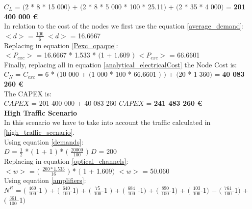 $C_L$ = $($2 * 8 * 15 000$)$ + $($2 * 8 * 5 000 * 100 * 25.11$)$ + $($2 * 35 * 4 000$)$ = \textbf{201 400 000 \euro}\\

In relation to the cost of the nodes we first use the equation \ref{average_demand}:\\

$<d>$ = $\frac{100}{6}$ \qquad \qquad $<d>$ = 16.6667\\

Replacing in equation \ref{Pexc_opaque}:\\

$<P_{exc}>$ = 16.6667 * 1.533 * $($1 + $1.609$ $)$ \qquad \qquad $<P_{exc}>$ = 66.6601 \\

Finally, replacing all in equation \ref{analytical_electricalCost} the Node Cost is:\\

$C_N$ = $C_{exc}$ = 6 * $($10 000 + $($1 000 * 100 * 66.6601 $)$ $)$ + $($20 * 1 360$)$ = \textbf{40 083 260 \euro}\\

The CAPEX is:\\

$CAPEX$ = 201 400 000 + 40 083 260 \qquad \qquad $CAPEX$ = \textbf{241 483 260 \euro}\\

\textbf{High Traffic Scenario}\\

In this scenario we have to take into account the traffic calculated in \ref{high_traffic_scenario}.\\

Using equation \ref{demands}:\\

$D$ = $\frac{1}{2}$ * $($ 1 + 1 $)$ * $($ $\frac{20000}{100}$ $)$ \qquad \qquad $D$ = 200\\

Replacing in equation \ref{optical_channels}:\\

$<w>$ = $($ $\frac{200 * 1.533}{16}$ $)$ * $($ 1 + 1.609$)$ \qquad \qquad $<w>$ = 50.060\\

Using equation \ref{amplifiers}:\\

$N^R$ = $($ $\frac{460}{100}$-1 $)$ + $($ $\frac{640}{100}$-1$)$ + $($ $\frac{75}{100}$-1 $)$ + $($ $\frac{684}{100}$ -1$)$ + $($ $\frac{890}{100}$-1$)$ + $($ $\frac{103}{100}$-1$)$ + $($ $\frac{761}{100}$-1$)$ + $($ $\frac{361}{100}$-1$)$\\

